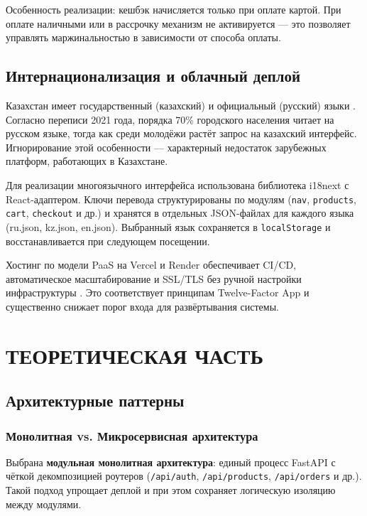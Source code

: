 \documentclass[14pt,a4paper]{extreport}
\begin{document}
Особенность реализации: кешбэк начисляется только при оплате картой. При оплате наличными или в рассрочку механизм не активируется — это позволяет управлять маржинальностью в зависимости от способа оплаты.

\section{Интернационализация и облачный деплой}

Казахстан имеет государственный (казахский) и официальный (русский) языки \cite{stat2023}. Согласно переписи 2021 года, порядка 70\% городского населения читает на русском языке, тогда как среди молодёжи растёт запрос на казахский интерфейс. Игнорирование этой особенности — характерный недостаток зарубежных платформ, работающих в Казахстане.

Для реализации многоязычного интерфейса использована библиотека i18next с React-адаптером. Ключи перевода структурированы по модулям (\texttt{nav}, \texttt{products}, \texttt{cart}, \texttt{checkout} и др.) и хранятся в отдельных JSON-файлах для каждого языка (ru.json, kz.json, en.json). Выбранный язык сохраняется в \texttt{localStorage} и восстанавливается при следующем посещении.

Хостинг по модели PaaS на Vercel и Render обеспечивает CI/CD, автоматическое масштабирование и SSL/TLS без ручной настройки инфраструктуры \cite{12factor}. Это соответствует принципам Twelve-Factor App и существенно снижает порог входа для развёртывания системы.

\chapter{ТЕОРЕТИЧЕСКАЯ ЧАСТЬ}

\section{Архитектурные паттерны}

\subsection{Монолитная vs. Микросервисная архитектура}

Выбрана \textbf{модульная монолитная архитектура}: единый процесс FastAPI с чёткой декомпозицией роутеров (\texttt{/api/auth}, \texttt{/api/products}, \texttt{/api/orders} и др.). Такой подход упрощает деплой и при этом сохраняет логическую изоляцию между модулями.
\end{document}
